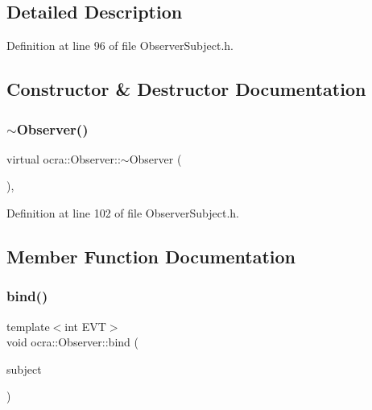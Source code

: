\subsection{Detailed Description}


Definition at line 96 of file Observer\+Subject.\+h.



\subsection{Constructor \& Destructor Documentation}
\hypertarget{classocra_1_1Observer_ab151b904aff28f8829b0e40048f5e737}{}\label{classocra_1_1Observer_ab151b904aff28f8829b0e40048f5e737} 
\subsubsection{\texorpdfstring{$\sim$\+Observer()}{~Observer()}}
{\footnotesize\ttfamily virtual ocra\+::\+Observer\+::$\sim$\+Observer (\begin{DoxyParamCaption}{ }\end{DoxyParamCaption})\hspace{0.3cm}{\ttfamily [inline]}, {\ttfamily [virtual]}}



Definition at line 102 of file Observer\+Subject.\+h.



\subsection{Member Function Documentation}
\hypertarget{classocra_1_1Observer_ab75bb7215b9e8af0e87420e29dd42c37}{}\label{classocra_1_1Observer_ab75bb7215b9e8af0e87420e29dd42c37} 
\subsubsection{\texorpdfstring{bind()}{bind()}}
{\footnotesize\ttfamily template$<$int E\+VT$>$ \\
void ocra\+::\+Observer\+::bind (\begin{DoxyParamCaption}\item[{\hyperlink{classocra_1_1SubjectBase}{Subject\+Base}$<$ E\+VT $>$ \&}]{subject }\end{DoxyParamCaption})\hspace{0.3cm}{\ttfamily [inline]}}



